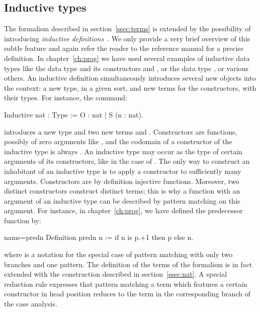 \subsection{Inductive types}\label{ssec:indtypes}

The formalism described in section~\ref{ssec:terms} is extended by
the possibility of introducing
\emph{inductive definitions}~\cite{CoPa89, Moh93}. We only provide a
very brief overview of this subtle feature and again refer the reader
to the reference manual for a precise definition.
In chapter~\ref{ch:prog} we have used several examples of inductive
data types like the data type  and its constructors  and
, or the data type , or various others.
An inductive definition simultaneously introduces
several new objects into the context: a new type, in a given sort, and
new terms for the constructors, with their types. For instance, the
command:

\begin{coq}{}{}
Inductive nat : Type := O : nat | S (n : nat).
\end{coq}
introduces a new type  and two new terms  and
. Constructors are functions, possibly of zero
arguments like , and the codomain of a constructor of the
inductive type  is always . An inductive type may occur as
the type of certain arguments of its constructors, like in the case of
. The only way to construct an inhabitant of an
inductive type is to apply a constructor to sufficiently many
arguments. Constructors are by definition injective functions.
Moreover, two distinct constructors construct distinct
terms; this is why a function with an argument of an inductive type can be
described by pattern matching on this argument. For instance, in
chapter~\ref{ch:prog}, we have defined the predecessor function by:

\begin{coq}{name=predn}{}
Definition predn n := if n is p.+1 then p else n.
\end{coq}
where  is a notation for the special case of
pattern matching with only two branches and one pattern. The definition of
the terms of the formalism is in fact extended with the
 construction described in
section~\ref{ssec:nat}. A special reduction rule expresses that
pattern matching a term which features a certain constructor in head
position reduces to the term in the corresponding branch of the case
analysis.


